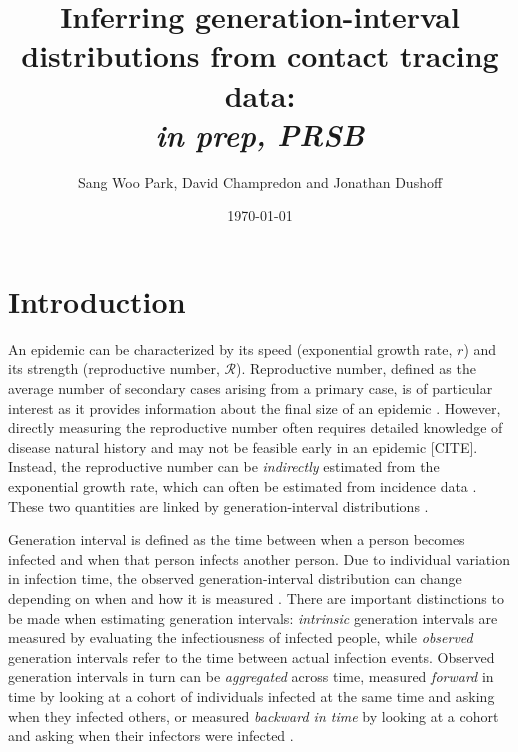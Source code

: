 \documentclass[12pt]{article}
\title{Inferring generation-interval distributions from contact tracing data: \\ \emph{in prep, PRSB}}
\author{Sang Woo Park, David Champredon and Jonathan Dushoff}
\date{\today}
\newcommand{\RR}{\ensuremath{{\mathcal R}}}
\begin{document}
\maketitle

\section{Introduction}


An epidemic can be characterized by its speed (exponential growth rate, $r$) and its strength (reproductive number, \RR).
Reproductive number, defined as the average number of secondary cases arising from a primary case, is of particular interest as it provides information about the final size of an epidemic \citep{anderson1991infectious, diekmann1990definition}.
However, directly measuring the reproductive number often requires detailed knowledge of disease natural history and may not be feasible early in an epidemic [CITE].
Instead, the reproductive number can be \emph{indirectly} estimated from the exponential growth rate, which can often be estimated from incidence data \citep{mills2004transmissibility, nishiura2009transmission, ma2014estimating}.
These two quantities are linked by generation-interval distributions \citep{wallinga2007generation, park2019practical}.

Generation interval is defined as the time between when a person becomes infected and when that person infects another person.
Due to individual variation in infection time, the observed generation-interval distribution can change depending on when and how it is measured \citep{svensson2007note, kenah2008generation, nishiura2010time, champredon2015intrinsic}.
There are important distinctions to be made when estimating generation intervals: \emph{intrinsic} generation intervals are measured by evaluating the infectiousness of infected people,
while \emph{observed} generation intervals refer to the time between actual infection events.
Observed generation intervals in turn can be \emph{aggregated} across time, measured \emph{forward} in time by looking at a cohort of individuals infected at the same time and asking when they infected others, or measured \emph{backward in time} by looking at a cohort and asking when their infectors were infected \citep{champredon2015intrinsic}.
\end{document}
